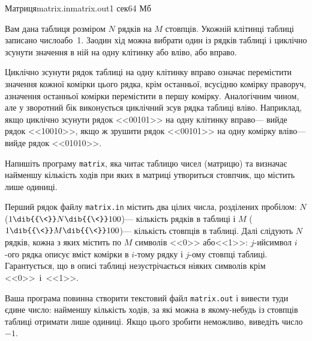 \begin{problem}{Матриця}{matrix.in}{matrix.out}{1 сек}{64 Мб}

Вам дана таблиця розміром $N$ рядків на $M$ стовпців. У\nolinebreak[3] кожній клітинці таблиці записано
число\nolinebreak[2] або~1. За\nolinebreak[2] один хід можна вибрати один із рядків таблиці і циклічно зсунути
значення в ній на одну клітинку або вліво, або вправо.

Циклічно зсунути рядок таблиці на одну клітинку вправо означає перемістити значення
кожної комірки цього рядка, крім останньої, в\nolinebreak[2] сусідню комірку праворуч, а\nolinebreak[2] значення
останньої комірки перемістити в першу комірку. Аналогічним чином, але у зворотний бік
виконується циклічний зсув рядка таблиці вліво. Наприклад, якщо циклічно зсунути рядок
<<00101>> на одну клітинку вправо\nolinebreak[3] --- вийде рядок <<10010>>, якщо ж зрушити рядок <<00101>> на
одну комірку вліво\nolinebreak[3] --- вийде рядок <<01010>>.

\Task 
Напишіть програму \texttt{matrix}, яка читає таблицю чисел (матрицю) та визначає
найменшу кількість ходів при яких в матриці утвориться стовпчик, що містить лише
одиниці.

\InputFile
Перший рядок файлу \texttt{matrix.іn} містить два цілих числа, розділених
пробілом: $N$ ($1\dib{{\<}}N\dib{{\<}}100$)\nolinebreak[3] --- кількість рядків в таблиці і $M$ ($1\dib{{\<}}M\dib{{\<}}100$)\nolinebreak[3] --- кількість стовпців в
таблиці. Далі слідують $N$ рядків, кожна з яких містить по $M$ символів <<0>> або\nolinebreak[3] <<1>>: \mbox{$j$-ий}\nolinebreak[3]
символ \mbox{$i$-ого} рядка описує вміст комірки в \mbox{$i$-тому} рядку і \mbox{$j$-ому} стовпці таблиці.
Гарантується, що в описі таблиці не\nolinebreak[3] зустрічається ніяких символів крім <<0>>~і~<<1>>.

\OutputFile
Ваша програма повинна створити текстовий файл \texttt{matrix.out} і вивести туди
єдине число: найменшу кількість ходів, за які можна в якому-небудь із стовпців таблиці
отримати лише одиниці. Якщо цього зробити неможливо, виведіть число~$-1$.

\Examples
\begin{exampleWidthsAndDefaultFileNames}{2em}{2em}%
%
\end{exampleWidthsAndDefaultFileNames}
\begin{exampleWidthsAndDefaultFileNames}{2em}{2em}%
%
\end{exampleWidthsAndDefaultFileNames}

\end{problem}
\pagebreak[2]